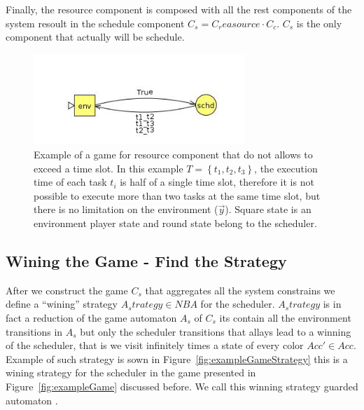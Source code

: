 \documentclass[ twoside, 12pt ]{article}
\begin{document}
Finally, the resource component is composed with all the rest components of the system resoult in the schedule component $C_s = C_reasource \cdot C_c$. $C_s$ is the only component that actually will be schedule.

\begin{figure} %
    \centerline{\includegraphics[width=80mm]{reasourceGame.jpg}}
    \caption{Example of a game for resource component that do not allows to exceed a time slot. 
        In this example $T = \left\{ t_1 , t_2 , t_3 \right\}$, the execution time of each task $t_i$ is half of a single time slot, therefore it is not possible to execute more than two tasks at the same time slot, but there is no limitation on the environment ($\vec{y}$).
        Square state is an environment player state and round state belong to the scheduler. }
    \label{fig:C_reasource}
\end{figure}

\subsection{Wining the Game - Find the Strategy}

After we construct the game $C_s$ that aggregates all the system constrains we define a ``wining'' strategy $A_strategy \in NBA$ for the scheduler.
$A_strategy$ is in fact a reduction of the game automaton $A_s$ of $C_s$ its contain all the environment transitions in $A_s$ but only the scheduler transitions that allays lead to a winning of the scheduler, that is we visit infinitely times a state of every color $Acc' \in Acc$.
Example of such strategy is sown in Figure~\ref{fig:exampleGameStrategy} this is a wining strategy for the scheduler in the game presented in Figure~\ref{fig:exampleGame} discussed before.
We call this winning strategy guarded automaton .
\end{document}
